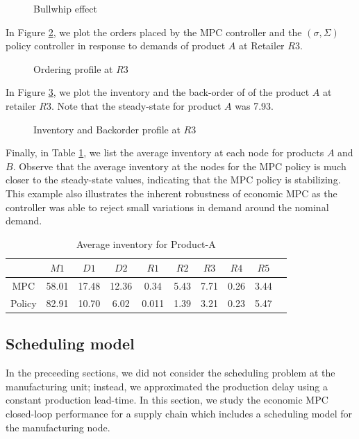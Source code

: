 \documentclass[10pt]{article}
\theoremstyle{definition}
\begin{document}
\begin{figure}
\centering
\scriptsize
\resizebox{0.5\textwidth}{!}{}
\caption{Bullwhip effect}
\label{fig:bullwhip}
\end{figure}

In Figure \ref{fig:Order}, we plot the orders placed by the MPC
controller and the $(\sigma,\Sigma)$ policy controller in response to
demands of product $A$ at Retailer $R3$.

\begin{figure}
\centering
\scriptsize
\resizebox{0.5\textwidth}{!}{}
\caption{Ordering profile at $R3$}
\label{fig:Order}
\end{figure}

In Figure \ref{fig:R3}, we plot the inventory and the
back-order of  of the product $A$
at retailer $R3$. Note that the steady-state for product $A$ was
7.93. 

\begin{figure}
\centering
\scriptsize
\resizebox{1\textwidth}{!}{}
\caption{Inventory and Backorder profile at $R3$}
\label{fig:R3}
\end{figure}

Finally, in Table \ref{tab:avgA}, we list the
average inventory at each node for products $A$ and $B$. Observe that
the average inventory at the nodes for the MPC policy is much closer
to the steady-state values, indicating that the MPC policy is
stabilizing. This example also illustrates the inherent robustness of
economic MPC as the controller was able to reject small variations in
demand around the nominal demand.

\begin{table}
\caption{Average inventory for Product-A}
\label{tab:avgA}
\begin{center}
\begin{tabular}{cccccccccc}\toprule
 &$M1$&$D1$&$D2$&$R1$&$R2$&$R3$&$R4$&$R5$\\ \midrule
MPC&58.01&17.48&12.36&0.34&5.43&7.71&0.26&3.44\\ 
Policy&82.91&10.70&6.02&0.011&1.39&3.21&0.23&5.47\\
\bottomrule 
\end{tabular}
\end{center}
\end{table}
\subsection{Scheduling model}
\label{subsec:scheduling}
In the preceeding sections, we did not consider the scheduling problem
at the manufacturing unit; instead, we approximated the production
delay using a constant production lead-time. In this section, we study
the economic MPC closed-loop performance for a supply chain which
includes a scheduling model for the manufacturing node.
\end{document}
